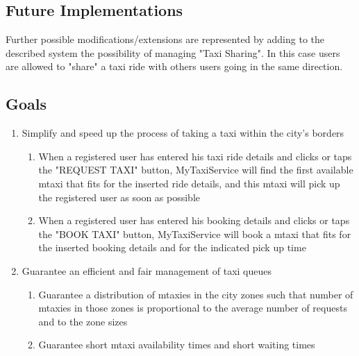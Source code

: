 \documentclass[11pt,titlepage]{article} %
\begin{document}
  \subsection{Future Implementations}
	Further possible modifications/extensions are represented by adding to the described system
	the possibility of managing "Taxi Sharing". In this case users are allowed to "share" a taxi ride with others
	users going in the same direction.

  \subsection{Goals}
	\begin{enumerate}
	    \item Simplify and speed up the process of taking a taxi within the city's borders
		\begin{enumerate}
		      \item When a registered user has entered his taxi ride details and clicks or taps
		      the "REQUEST TAXI" button, MyTaxiService will find the first
		      available mtaxi that fits for the inserted ride details, and this mtaxi will
		      pick up the registered user as soon as possible

		      \item When a registered user has entered his booking details and clicks or taps
		        the "BOOK TAXI" button, MyTaxiService will book a mtaxi that fits for the
		        inserted booking details and for the indicated pick up time
		\end{enumerate}

	    \item Guarantee an efficient and fair management of taxi queues
	  	\begin{enumerate}
		      \item Guarantee a distribution of mtaxies in the city zones such that number of mtaxies in those zones is proportional to the average number of requests and to the zone sizes

		      \item Guarantee short mtaxi availability times and short waiting times
		\end{enumerate}
	\end{enumerate}
\end{document}
